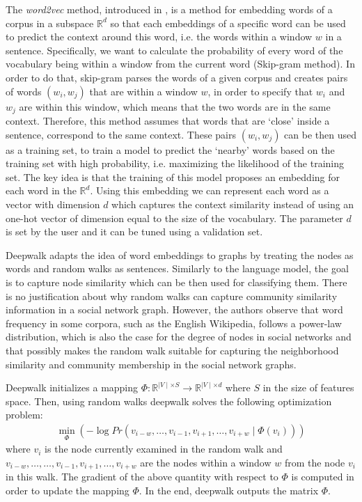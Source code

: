 The \emph{word2vec} method, introduced in \cite{mikolov2013efficient}, is a
method for embedding words of a corpus in a subspace $\mathbb{R}^d$ so that
each embeddings of a specific word can be used to predict the context around this
word, i.e. the words within a window $w$ in a sentence. Specifically, we
want to calculate the probability of every word of the vocabulary being
within a window from the current word (Skip-gram method).
In order to do that, skip-gram parses the words of a given corpus and creates
pairs of words $(w_i, w_j)$ that are within a window $w$, in order to specify
that $w_i$ and $w_j$ are within this window, which means that the two words
are in the same context. Therefore, this method assumes that words that are
`close' inside a sentence, correspond to the same context. These pairs
$(w_i, w_j)$ can be then used as a training set, to train a model to predict the
`nearby' words based on the training set with high probability, i.e. maximizing
the likelihood of the training set. The key idea is that the training of this
model proposes an embedding for each word in the $\mathbb{R}^d$.
Using this embedding we can represent each word as a vector with dimension $d$
which captures the context similarity instead of using an one-hot vector of
dimension equal to the size of the vocabulary. The parameter $d$ is set by the
user and it can be tuned using a validation set.

Deepwalk adapts the idea of word embeddings to graphs by treating the nodes as
words and random walks as sentences. Similarly to the language model, the goal
is to capture node similarity which can be then used for classifying them.
There is no justification about why random walks can capture community
similarity information in a social network graph. However, the authors
observe that word frequency in some corpora, such as the English Wikipedia,
follows a power-law distribution, which is also the case for the degree of nodes
in social networks and that
possibly makes the random walk suitable for capturing the neighborhood
similarity and community membership in the social network graphs.

Deepwalk initializes a mapping
$\Phi: \mathbb{R}^{\mid V \mid \times S} \to \mathbb{R}^{\mid V\mid \times d}$
where $S$ in the size of features space. Then, using random walks deepwalk solves
the following optimization problem:
\begin{align}
    \min_{\Phi}
        \left (-\log{Pr({v_{i-w},
                \ldots, v_{i-1}, v_{i+1},
                \ldots , v_{i+w}} \mid \Phi(v_i))}
        \right )
\end{align}
where $v_i$ is the node currently examined in the random walk and
$v_{i-w}, \ldots, \ldots, v_{i-1}, v_{i+1},\ldots, v_{i+w}$ are the nodes
within a window $w$ from the node $v_i$ in this walk. The gradient of the above
quantity with respect to $\Phi$ is
computed in order to update the mapping $\Phi$. In the end, deepwalk outputs
the matrix $\Phi$.

